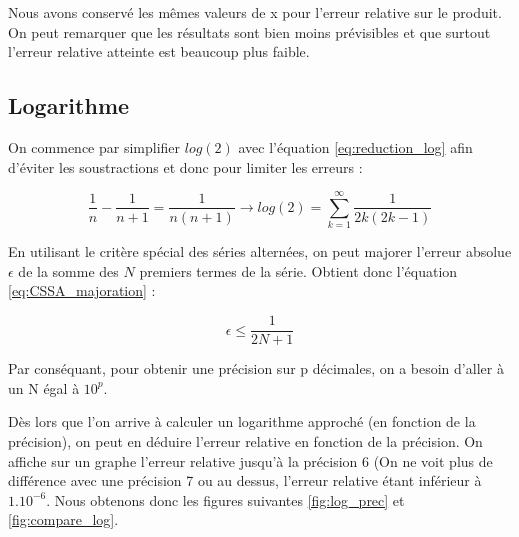 \documentclass{article}
\begin{document}
Nous avons conservé les mêmes valeurs de x pour l'erreur relative sur le produit. On peut remarquer que les résultats sont bien moins prévisibles et que surtout l'erreur relative atteinte est beaucoup plus faible. 

\subsection*{Logarithme}

On commence par simplifier $log(2)$ avec l'équation \ref{eq:reduction_log} afin d'éviter les soustractions et donc pour limiter les erreurs : 

\begin{equation}
\frac{1}{n}-\frac{1}{n+1}=\frac{1}{n(n+1)} \rightarrow log(2) = \sum_{k=1}^{\infty}\frac{1}{2k(2k-1)}
\label{eq:reduction_log}
\end{equation}

En utilisant le critère spécial des séries alternées, on peut majorer l'erreur absolue $\epsilon$ de la somme des $N$ premiers termes de la série. Obtient donc l'équation \ref{eq:CSSA_majoration} :

\begin{equation}
    \epsilon \leq \frac{1}{2N+1}
    \label{eq:CSSA_majoration}
\end{equation}

Par conséquant, pour obtenir une précision sur p décimales, on a besoin d'aller à un N égal à ${10^{p}}$. 

Dès lors que l'on arrive à calculer un logarithme approché (en fonction de la précision), on peut en déduire l'erreur relative en fonction de la précision. On affiche sur un graphe l'erreur relative jusqu'à la précision 6 (On ne voit plus de différence avec une précision 7 ou au dessus, l'erreur relative étant inférieur à ${1.10^{-6}}$. Nous obtenons donc les figures suivantes \ref{fig:log_prec} et \ref{fig:compare_log}.
\end{document}
